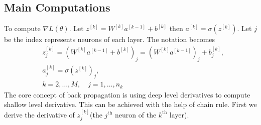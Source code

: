\documentclass[../main.tex]{subfiles}
\begin{document}
        \subsection{Main Computations}
            To compute $\nabla L(\theta)$. Let $z^{ [k] } = W^{ [k] } a^{ [k-1] } + b^{ [k] }$ then $a^{ [k] } = \sigma(z^{ [k] })$.
            Let $j$ be the index represents neurons of each layer. The notation becomes
            \begin{align*}
                & z_j^{[k]}=(W^{[k]}a^{[k-1]}+b^{[k]})_j=(W^{[k]}a^{[k-1]})_j+b_j^{[k]}, \\
                & a_j^{[k]}=\sigma(z^{[k]})_j, \\
                & k=2,\dots,M,\quad j=1,\dots,n_k
            \end{align*}
            The core concept of back propagation is using deep level derivatives to compute shallow level derivative. This can be achieved with the help of chain rule. First we derive the derivative of $z^{[k]}_j$(the $j^\mathrm{th}$ neuron of the $k^\mathrm{th}$ layer).
\end{document}
